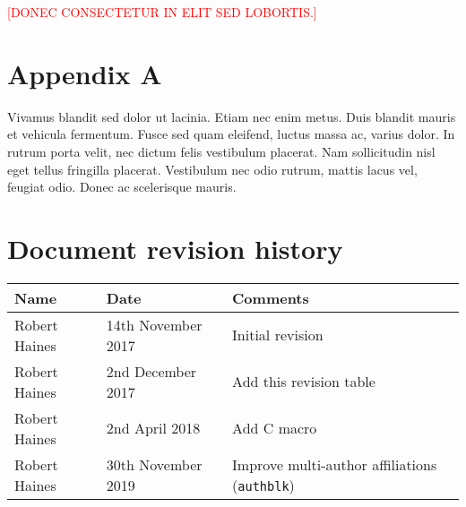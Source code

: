 \documentclass[11pt]{article}
\def\cpp{{C\nolinebreak[4]\hspace{-.05em}\raisebox{.4ex}{\tiny\bf ++}}\xspace}
\newcommand{\notetoself}[1]{\textcolor{red}{[\uppercase{#1}]}}
\begin{document}
\notetoself{Donec consectetur in elit sed lobortis.}

\begin{appendices}

\section{Appendix A}

Vivamus blandit sed dolor ut lacinia. Etiam nec enim metus. Duis blandit mauris et vehicula fermentum. Fusce sed quam eleifend, luctus massa ac, varius dolor. In rutrum porta velit, nec dictum felis vestibulum placerat. Nam sollicitudin nisl eget tellus fringilla placerat. Vestibulum nec odio rutrum, mattis lacus vel, feugiat odio. Donec ac scelerisque mauris.

\section{Document revision history}

\begin{tabularx}{\textwidth}{ |l|l|X| }
  \hline
  \textbf{Name} & \textbf{Date} & \textbf{Comments} \\
  \hline \hline
  Robert Haines & 14th November 2017 & Initial revision \\
  \hline
  Robert Haines & 2nd December 2017 & Add this revision table \\
  \hline
  Robert Haines & 2nd April 2018 & Add \cpp macro \\
  \hline
  Robert Haines & 30th November 2019 & Improve multi-author affiliations (\texttt{authblk}) \\
  \hline
\end{tabularx}

\end{appendices}
\end{document}

